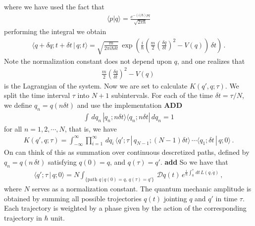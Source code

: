 \documentclass[11pt, onesided]{book}
\theoremstyle{break}
\theoremstyle{break}
\begin{document}
where we have used the fact that
\begin{align*}
\langle p|q\rangle = \frac{e^{-(i/\hbar)pq}}{\sqrt{2\pi \hbar}}
\end{align*}
performing the integral we obtain
\begin{align*}
\langle q+\delta q ; t+\delta t\,|\, q;t\rangle = \sqrt{\frac{m}{2\pi i\hbar \delta t}}\, \exp\left(\frac{i}{\hbar}\left(\frac{m}{2}\left(\frac{\delta q}{\delta t}\right)^2 - V(q)\right)\, \delta t\right)\,.
\end{align*}
Note the normalization constant does not depend upon $q$, and one realizes that
\begin{align*}
\frac{m}{2} \left(\frac{\delta q}{\delta t}\right)^2 - V(q)\,
\end{align*}
is the Lagrangian of the system. Now we are set to calculate $K(q',q;\tau)$. We split the time interval $\tau$ into $N+1$ subintervals. For each of the time $\delta t = \tau/N$, we define $q_n = q(n\delta t)$ and use the implementation \textbf{ADD}
\begin{align*}
\int \, dq_n \, |q_n ; n \delta t\rangle \langle q_n ; n\delta t| \, dq_n = 1
\end{align*}
for all $n=1,2,\cdots, N$, that is, we have
\begin{align*}
K(q',q;\tau) =\int_{-\infty}^\infty \prod_{i=1}^\infty \,dq_i\, \langle q';\tau \, | \, q_{N-1}; (N-1) \delta t\rangle \, \cdots \langle q_1; \delta t\, |\, q; 0\rangle\,.
\end{align*}
On can think of this as summation over continuous descretized paths, defined by $q_n = q(n\,\delta t)$ satisfying $q(0) = q$, and $q(\tau) = q'$. 
\textbf{add}
So we have that
\begin{align*}
\langle q';\tau \, | \, q;0\rangle = N \int_{\{\text{path }q\, |\, q(0) = q,\, q(\tau) = q'\}} \, \mathcal{D}q(t) \, e^{\frac{i}{\hbar}\int_0^\tau \, dt \, L(q,\dot{q})}\,,
\end{align*}
where $N$ serves as a normalization constant. The quantum mechanic amplitude is obtained by summing all possible trojectories $q(t)$ jointing $q$ and $q'$ in time $\tau$. Each trajectory is weighted by a phase given by the action of the corresponding trajectory in $\hbar$ unit. 
\end{document}
